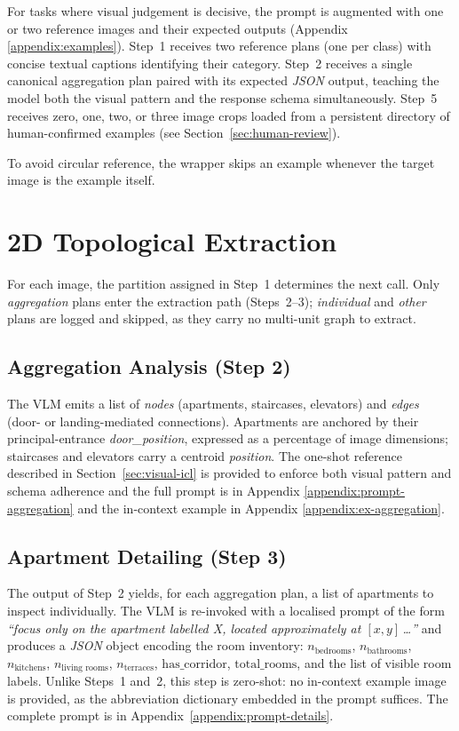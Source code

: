 \documentclass[12pt,a4paper,openright]{report}
\begin{document}
For tasks where visual judgement is decisive, the prompt is augmented with one or two reference images and their expected outputs (Appendix \ref{appendix:examples}). Step~1 receives two reference plans (one per class) with concise textual captions identifying their category. Step~2 receives a single canonical aggregation plan paired with its expected \textit{JSON} output, teaching the model both the visual pattern and the response schema simultaneously. Step~5 receives zero, one, two, or three image crops loaded from a persistent directory of human-confirmed examples (see Section~\ref{sec:human-review}).

To avoid circular reference, the wrapper skips an example whenever the target image is the example itself.

\section{2D Topological Extraction}

For each image, the partition assigned in Step~1 determines the next call. Only \textit{aggregation} plans enter the extraction path (Steps~2--3); \textit{individual} and \textit{other} plans are logged and skipped, as they carry no multi-unit graph to extract.

\subsection{Aggregation Analysis (Step 2)}

The VLM emits a list of \emph{nodes} (apartments, staircases, elevators) and \emph{edges} (door- or landing-mediated connections). Apartments are anchored by their principal-entrance \emph{door\_position}, expressed as a percentage of image dimensions; staircases and elevators carry a centroid \emph{position}. The one-shot reference described in Section~\ref{sec:visual-icl} is provided to enforce both visual pattern and schema adherence and the full prompt is in Appendix \ref{appendix:prompt-aggregation} and the in-context example in Appendix \ref{appendix:ex-aggregation}.


\subsection{Apartment Detailing (Step 3)}

The output of Step~2 yields, for each aggregation plan, a list of apartments to inspect individually. The VLM is re-invoked with a localised prompt of the form \textit{``focus only on the apartment labelled X, located approximately at $[x, y]$\,\ldots''} and produces a \textit{JSON} object encoding the room inventory: $n_{\text{bedrooms}}$, $n_{\text{bathrooms}}$, $n_{\text{kitchens}}$, $n_{\text{living rooms}}$, $n_{\text{terraces}}$, $\text{has\_corridor}$, $\text{total\_rooms}$, and the list of visible room labels. Unlike Steps~1 and~2, this step is zero-shot: no in-context example image is provided, as the abbreviation dictionary embedded in the prompt suffices. The complete prompt is in Appendix~\ref{appendix:prompt-details}.
\end{document}
